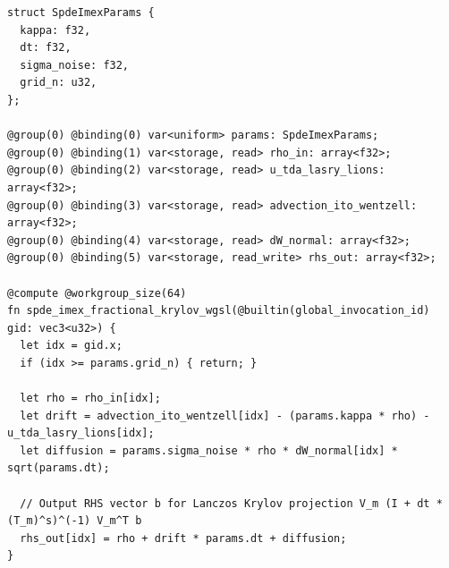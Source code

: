 \documentclass[11pt,a4paper,reqno]{article}
\theoremstyle{plain}
\theoremstyle{definition}
\theoremstyle{remark}
\numberwithin{equation}{section}
\begin{document}
\begin{lstlisting}[style=spdekernel, caption={Version 3.0 / 4.0 (DOIs 10.5281/zenodo.23204914, 10.5281/zenodo.23183301 \& 10.5281/zenodo.23185254): 64x64 WebGPU WGSL Compute Shader for Real-Time Planetary EDL Fractional SPDE Execution.}, label={lst:wgsl_imex}]
struct SpdeImexParams {
  kappa: f32,
  dt: f32,
  sigma_noise: f32,
  grid_n: u32,
};

@group(0) @binding(0) var<uniform> params: SpdeImexParams;
@group(0) @binding(1) var<storage, read> rho_in: array<f32>;
@group(0) @binding(2) var<storage, read> u_tda_lasry_lions: array<f32>;
@group(0) @binding(3) var<storage, read> advection_ito_wentzell: array<f32>;
@group(0) @binding(4) var<storage, read> dW_normal: array<f32>;
@group(0) @binding(5) var<storage, read_write> rhs_out: array<f32>;

@compute @workgroup_size(64)
fn spde_imex_fractional_krylov_wgsl(@builtin(global_invocation_id) gid: vec3<u32>) {
  let idx = gid.x;
  if (idx >= params.grid_n) { return; }

  let rho = rho_in[idx];
  let drift = advection_ito_wentzell[idx] - (params.kappa * rho) - u_tda_lasry_lions[idx];
  let diffusion = params.sigma_noise * rho * dW_normal[idx] * sqrt(params.dt);

  // Output RHS vector b for Lanczos Krylov projection V_m (I + dt * (T_m)^s)^(-1) V_m^T b
  rhs_out[idx] = rho + drift * params.dt + diffusion;
}
\end{lstlisting}
\end{document}
